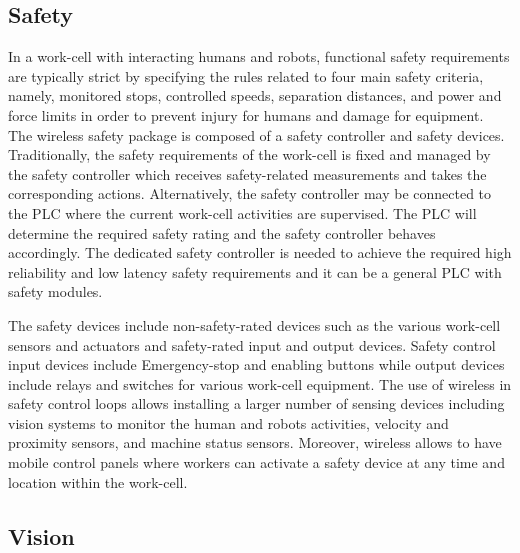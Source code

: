 \subsection{Safety}\label{sysml:sec:safety}

In a work-cell with interacting humans and robots, functional safety requirements are typically strict by specifying the rules related to four main safety criteria, namely, monitored stops, controlled speeds, separation distances, and power and force limits in order to prevent injury for humans and damage for equipment. The wireless safety package is composed of a safety controller and safety devices. Traditionally, the safety requirements of the work-cell is fixed and managed by the safety controller which receives safety-related measurements and takes the corresponding actions. Alternatively, the safety controller may be connected to the PLC where the current work-cell activities are supervised.  The PLC will determine the required safety rating and the safety controller behaves accordingly. The dedicated safety controller is needed to achieve the required high reliability and low latency safety requirements and it can be a general PLC with safety modules. 

The safety devices include non-safety-rated devices such as the various work-cell sensors and actuators and safety-rated input and output devices. Safety control input devices include Emergency-stop and enabling buttons while output devices include relays and switches for various work-cell equipment. The use of wireless in safety control loops allows installing a larger number of sensing devices including vision systems to monitor the human and robots activities, velocity and proximity sensors, and machine status sensors. Moreover, wireless allows to have mobile control panels where workers can activate a safety device at any time and location within the work-cell.        

\subsection{Vision}\label{sysml:sec:vision}

